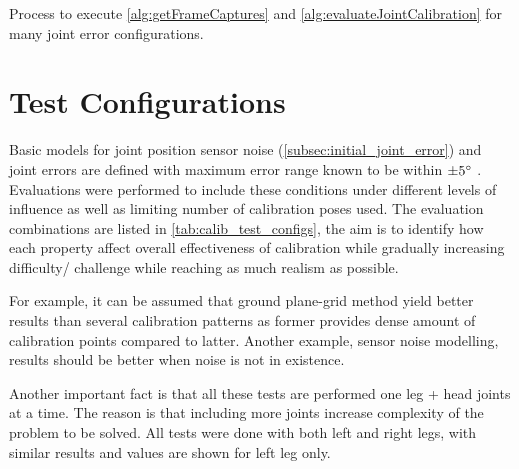 \documentclass[english, printversion, nomenclature, notitle]{tuvisionthesis} %
\begin{document}
\begin{algorithm}[H]
	\caption{Process to execute \cref{alg:getFrameCaptures} and \cref{alg:evaluateJointCalibration} for many joint error configurations.}	\label{alg:EvaluateCalibrationPoses}
	\BlankLine
\end{algorithm}

\section{Test Configurations}
\label{sec:test_configs}
Basic models for joint position sensor noise (\cref{subsec:initial_joint_error}) and joint errors are defined with maximum error range known to be within $\pm5\degree$ \cite{hutchison_automatic_2015}. Evaluations were performed to include these conditions under different levels of influence as well as limiting number of calibration poses used. The evaluation combinations are listed in \cref{tab:calib_test_configs}, the aim is to identify how each property affect overall effectiveness of calibration while gradually increasing difficulty/ challenge while reaching as much realism as possible.

For example, it can be assumed that ground plane-grid method yield better results than several calibration patterns as former provides dense amount of calibration points compared to latter. Another example, sensor noise modelling, results should be better when noise is not in existence.

Another important fact is that all these tests are performed one leg + head joints at a time. The reason is that including more joints increase complexity of the problem to be solved. All tests were done with both left and right legs, with similar results and values are shown for left leg only.
\end{document}
